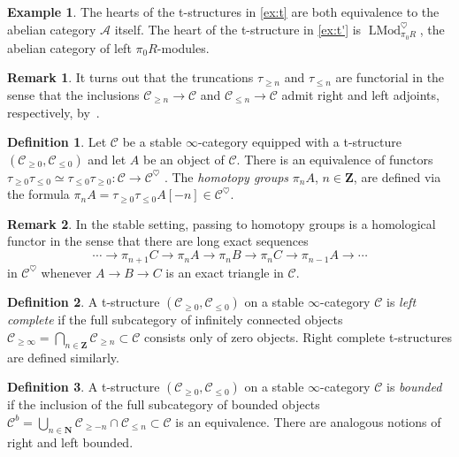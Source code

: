 \documentclass[12pt]{article}
\theoremstyle{definition}
\newtheorem{definition}{Definition}[subsection]
\newtheorem{example}{Example}[subsection]
\newtheorem{remark}{Remark}[subsection]
\newcommand{\A}{\mathcal{A}}
\newcommand{\C}{\mathcal{C}}
\newcommand{\NN}{\mathbf{N}}
\newcommand{\ZZ}{\mathbf{Z}}
\renewcommand{\i}{\infty}
\DeclareMathOperator{\LMod}{LMod}
\begin{document}
\begin{example}
The hearts of the t-structures in \autoref{ex:t} are both equivalence to the abelian category $\A$ itself.
The heart of the t-structure in \autoref{ex:t'} is $\LMod_{\pi_0R}^{\heartsuit}$, the abelian category of left $\pi_0R$-modules.
\end{example}
\begin{remark}
It turns out that the truncations $\tau_{\geq n}$ and $\tau_{\leq n}$ are functorial in the
sense that the inclusions $\C_{\geq n}\rightarrow \C$ and $\C_{\leq n}\rightarrow
\C$ admit right and left adjoints, respectively, by~\cite[Corollary~1.2.1.6]{HA}.
\end{remark}
\begin{definition}\label{tshg}
Let $\C$ be a stable $\i$-category equipped with a t-structure $(\C_{\geq 0},\C_{\leq 0})$ and let $A$ be an object of $\C$.
There is an equivalence of functors $\tau_{\geq 0}\tau_{\leq 0}\simeq\tau_{\leq 0}\tau_{\geq 0}:\C\to\C^\heartsuit$ \cite[Proposition 1.2.1.10]{HA}.
The {\em homotopy groups} $\pi_n A$, $n\in\ZZ$, are defined via the formula $\pi_nA=\tau_{\geq 0}\tau_{\leq 0}A[-n]\in \C^{\heartsuit}$.
\end{definition}
\begin{remark}
In the stable setting, passing to homotopy groups is a homological functor in the sense that there are long exact sequences
$$\cdots\rightarrow\pi_{n+1}C\rightarrow\pi_nA\rightarrow\pi_nB\rightarrow\pi_nC\rightarrow\pi_{n-1}A\rightarrow\cdots$$
in $\C^\heartsuit$ whenever $A\rightarrow B\rightarrow C$ is an exact triangle in $\C$.
\end{remark}

\begin{definition}
A t-structure $(\C_{\geq 0},\C_{\leq 0})$ on a stable $\infty$-category $\C$ is {\em left complete} if the full subcategory of infinitely connected objects $\C_{\geq\infty}=\bigcap_{n\in\ZZ}\C_{\geq n}\subset\C$
consists only of zero objects.
{Right complete} t-structures are defined similarly.
\end{definition}

\begin{definition}
A t-structure $(\C_{\geq 0},\C_{\leq 0})$ on a stable $\infty$-category $\C$ is  {\em bounded} if the inclusion of the full subcategory of bounded objects $\C^b=\bigcup_{n\in\NN}\C_{\geq -n}\cap \C_{\leq n}\subset \C$ is an equivalence.
There are analogous notions of right and left bounded.
\end{definition}
\end{document}
